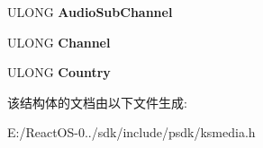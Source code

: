 \begin{DoxyCompactItemize}
U\+L\+O\+NG {\bfseries Audio\+Sub\+Channel}
\item 
\mbox{\label{struct_k_s_p_r_o_p_e_r_t_y___t_u_n_e_r___f_r_e_q_u_e_n_c_y___s_ad2c7d0c4aea87d442e23b4abe633d41f}} 
U\+L\+O\+NG {\bfseries Channel}
\item 
\mbox{\label{struct_k_s_p_r_o_p_e_r_t_y___t_u_n_e_r___f_r_e_q_u_e_n_c_y___s_aaa51519bc7fe86c8410e26711e9c26b2}} 
U\+L\+O\+NG {\bfseries Country}
\end{DoxyCompactItemize}


该结构体的文档由以下文件生成\+:\begin{DoxyCompactItemize}
\item 
E\+:/\+React\+O\+S-\/0../sdk/include/psdk/ksmedia.\+h\end{DoxyCompactItemize}
